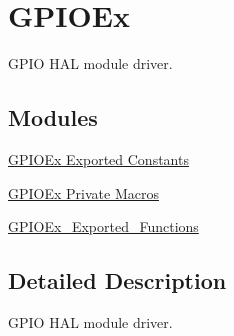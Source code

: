 \hypertarget{group___g_p_i_o_ex}{}\section{G\+P\+I\+O\+Ex}
\label{group___g_p_i_o_ex}


G\+P\+IO H\+AL module driver.  


\subsection*{Modules}
\begin{DoxyCompactItemize}
\item 
\hyperlink{group___g_p_i_o_ex___exported___constants}{G\+P\+I\+O\+Ex Exported Constants}
\item 
\hyperlink{group___g_p_i_o_ex___private___macros}{G\+P\+I\+O\+Ex Private Macros}
\item 
\hyperlink{group___g_p_i_o_ex___exported___functions}{G\+P\+I\+O\+Ex\+\_\+\+Exported\+\_\+\+Functions}
\end{DoxyCompactItemize}


\subsection{Detailed Description}
G\+P\+IO H\+AL module driver. 


